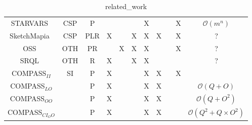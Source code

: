 {\begin{table*}[t]
\begin{center}
\begin{tabular}{|c|ccccccccc|c|}
            STARVARS~\cite{Lee2013}                     & CSP        & P   &   &   &   & X &   &   & X & $\mathcal{O}(m^n)$ \\
            SketchMapia~\cite{Schwering2014}            & CSP        & PLR & X &   & X & X & X &   & X & ? \\
            OSS~\cite{Liu2003}                          & OTH        & PR  &   & X & X & X &   &   & X & ? \\
            SRQL~\cite{Dellapenna2012,Dellapenna2017}   & OTH        & R   & X &   & X & X &   &   &   & ? \\
            COMPASS$_{II}$                              & SI         & P   & X &   &   & X & X &   & X &  \\
            COMPASS$_{LO}$                              &            & P   & X &   &   & X & X &   &   & $\mathcal{O}(Q + O)$ \\    
            COMPASS$_{OO}$                              &            & P   & X &   &   & X & X &   &   & $\mathcal{O}(Q + O^2)$ \\  
            COMPASS$_{CI_OO}$                           &            & P   & X &   &   & X & X &   &   & $\mathcal{O}(Q^2 + Q\times O^2)$ \\
            
            
            
            \hline     
        \end{tabular}
        \caption{related\_work} 
        \label{Table:related_work}
    \end{center}
\end{table*}
}


